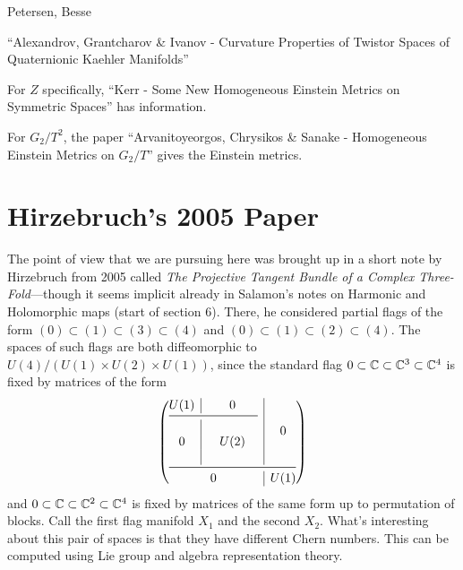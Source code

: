 \documentclass{scrartcl}
\begin{document}
Petersen, Besse 

\medskip

``Alexandrov, Grantcharov \& Ivanov - Curvature Properties of Twistor Spaces of Quaternionic Kaehler Manifolds''

\medskip

For $Z$ specifically, ``Kerr - Some New Homogeneous Einstein Metrics on Symmetric Spaces'' has information.

\medskip

For $G_2/T^2$, the paper ``Arvanitoyeorgos, Chrysikos \& Sanake - Homogeneous Einstein Metrics on $G_2/T$'' gives the Einstein metrics.



\section{Hirzebruch's 2005 Paper}

The point of view that we are pursuing here was brought up in a short note by Hirzebruch from 2005 called \emph{The Projective Tangent Bundle of a Complex Three-Fold}---though it seems implicit already in Salamon's notes on Harmonic and Holomorphic maps (start of section 6). There, he considered partial flags of the form $(0)\subset (1)\subset (3)\subset (4)$ and $(0)\subset (1)\subset (2)\subset(4)$. The spaces of such flags are both diffeomorphic to $U(4)/(U(1)\times U(2)\times U(1))$, since the standard flag $0\subset \mathbb{C}\subset \mathbb{C}^3\subset \mathbb{C}^4$ is fixed by matrices of the form
\begin{equation*}
	\left( 
	\begin{array}{@{}c|c@{}}
		\begin{array}{@{}c|ccc@{}}
			\begin{array}{@{}c@{}}
				U(1)
			\end{array} & & 0 & \\ \midrule
			& & & \\
			0 & & U(2) & \\
			& & &
		\end{array} 
		& 0 \\\midrule
		0 & U(1) \\
	\end{array}
	\right)
\end{equation*}
and $0\subset \mathbb{C}\subset \mathbb{C}^2\subset \mathbb{C}^4$ is fixed by matrices of the same form up to permutation of blocks. Call the first flag manifold $X_1$ and the second $X_2$. What's interesting about this pair of spaces is that they have different Chern numbers. This can be computed using Lie group and algebra representation theory.
\end{document}
